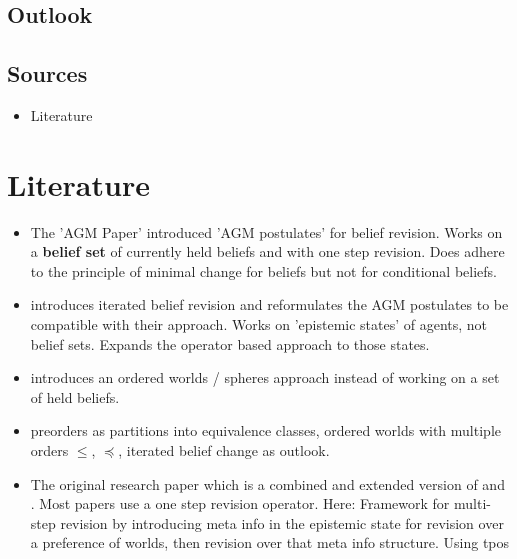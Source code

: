 \documentclass[11pt]{article}
\begin{document}
\subsection{Outlook}

\subsection{Sources}
\begin{itemize}
    \item Literature
\end{itemize}

\section{Literature}
\begin{itemize}
    \item The 'AGM Paper' \cite{Alchourron1985} introduced 'AGM postulates' for belief revision. Works on a \textbf{belief set} of currently held beliefs and with one step revision. Does adhere to the \gls{principle of minimal change} for beliefs but not for conditional beliefs.
    \item \cite{Darwiche1997} introduces iterated belief revision and reformulates the AGM postulates to be compatible with their approach. Works on 'epistemic states' of agents, not belief sets. Expands the operator based approach to those states.
    \item \cite{Grove1988} introduces an ordered worlds / spheres approach instead of working on a set of held beliefs.
    \item \cite{Booth2004} preorders as partitions into equivalence classes, ordered worlds with multiple orders $\leq$, $\preceq$, iterated belief change as outlook.
    \item The original research paper \cite{Booth2011} which is a combined and extended version of \cite{Booth2006} and \cite{Booth2007}. Most papers use a one step revision operator. Here: Framework for multi-step revision by introducing meta info in the epistemic state for revision over a preference of worlds, then revision over that meta info structure. Using \gls{tpos}
\end{itemize}

\newpage

\printglossaries

\typeout{}
\nocite{*}


\end{document}
